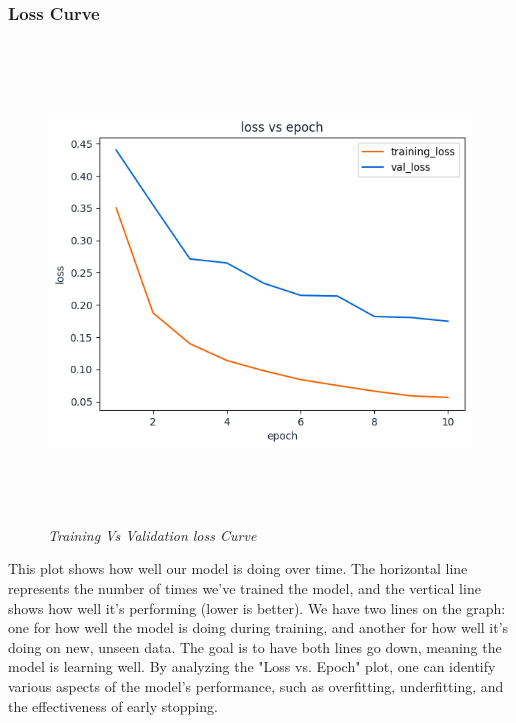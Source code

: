 \subsubsection{Loss Curve}
\begin{figure}[ht]
    \centering
    \includegraphics[width= 5in, height =5in ]{img/lossVsAccuracy.png}
    \caption{\textit{Training Vs Validation loss Curve}}
\end{figure}
This plot shows how well our model is doing over time. The horizontal line represents the number of times we've trained the model, and the vertical line shows how well it's performing (lower is better). We have two lines on the graph: one for how well the model is doing during training, and another for how well it's doing on new, unseen data. The goal is to have both lines go down, meaning the model is learning well. By analyzing the "Loss vs. Epoch" plot, one can identify various aspects of the model's performance, such as overfitting, underfitting, and the effectiveness of early stopping.

\newpage
